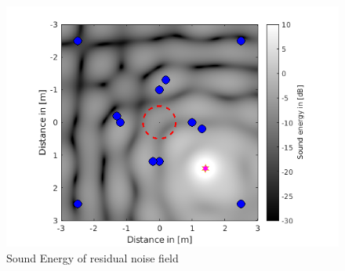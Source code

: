 \begin{figure}
    \centerline{\includegraphics[width=\textwidth]{LaTeX/images/plots/Point_source_reverberation.png}}
    \caption{Sound Energy of residual noise field}
    \label{fig:reverberation}
\end{figure}